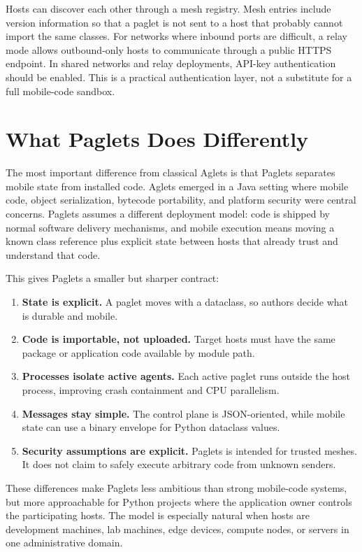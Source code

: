 \documentclass[11pt,a4paper]{article}
\begin{document}
Hosts can discover each other through a mesh registry. Mesh entries include
version information so that a paglet is not sent to a host that probably cannot
import the same classes. For networks where inbound ports are difficult, a
relay mode allows outbound-only hosts to communicate through a public HTTPS
endpoint. In shared networks and relay deployments, API-key authentication
should be enabled. This is a practical authentication layer, not a substitute
for a full mobile-code sandbox.

\section{What Paglets Does Differently}

The most important difference from classical Aglets is that Paglets separates
mobile state from installed code. Aglets emerged in a Java setting where mobile
code, object serialization, bytecode portability, and platform security were
central concerns. Paglets assumes a different deployment model: code is shipped
by normal software delivery mechanisms, and mobile execution means moving a
known class reference plus explicit state between hosts that already trust and
understand that code.

This gives Paglets a smaller but sharper contract:

\begin{enumerate}[leftmargin=*]
\item \textbf{State is explicit.} A paglet moves with a dataclass, so authors
  decide what is durable and mobile.
\item \textbf{Code is importable, not uploaded.} Target hosts must have the same
  package or application code available by module path.
\item \textbf{Processes isolate active agents.} Each active paglet runs outside
  the host process, improving crash containment and CPU parallelism.
\item \textbf{Messages stay simple.} The control plane is JSON-oriented, while
  mobile state can use a binary envelope for Python dataclass values.
\item \textbf{Security assumptions are explicit.} Paglets is intended for
  trusted meshes. It does not claim to safely execute arbitrary code from
  unknown senders.
\end{enumerate}

These differences make Paglets less ambitious than strong mobile-code systems,
but more approachable for Python projects where the application owner controls
the participating hosts. The model is especially natural when hosts are
development machines, lab machines, edge devices, compute nodes, or servers in
one administrative domain.
\end{document}
